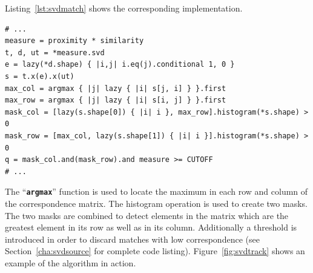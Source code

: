 \documentclass[12pt,a4paper,oneside,openright]{book}
\newcommand{\sct}[1]{Section~\ref{cha:#1}}
\newcommand{\fig}[1]{Figure~\ref{fig:#1}}
\newcommand{\lst}[1]{Listing~\ref{lst:#1}}
\newcommand{\code}[1]{``\texttt{\textbf{\textcolor{codegray}{\small{#1}}}}''}
\begin{document}
\begin{CJK}{UTF8}{}
\lst{svdmatch} shows the corresponding implementation.
\lstset{language=Ruby,frame=single,numbers=none}
\begin{lstlisting}[float,caption={\acs{SVD} matching},escapechar=\$,label=lst:svdmatch]
# ...
measure = proximity * similarity
t, d, ut = *measure.svd
e = lazy(*d.shape) { |i,j| i.eq(j).conditional 1, 0 }
s = t.x(e).x(ut)
max_col = argmax { |j| lazy { |i| s[j, i] } }.first
max_row = argmax { |j| lazy { |i| s[i, j] } }.first
mask_col = [lazy(s.shape[0]) { |i| i }, max_row].histogram(*s.shape) > 0
mask_row = [max_col, lazy(s.shape[1]) { |i| i }].histogram(*s.shape) > 0
q = mask_col.and(mask_row).and measure >= CUTOFF
# ...
\end{lstlisting}
The \code{argmax} function is used to locate the maximum in each row and column of the correspondence matrix. The histogram operation is used to create two masks. The two masks are combined to detect elements in the matrix which are the greatest element in its row as well as in its column. Additionally a threshold is introduced in order to discard matches with low correspondence (see \sct{svdsource} for complete code listing).
\fig{svdtrack} shows an example of the algorithm in action.
\begin{figure}[htbp]
  \begin{center}

\end{center}
\end{figure}
\end{CJK}
\end{document}
